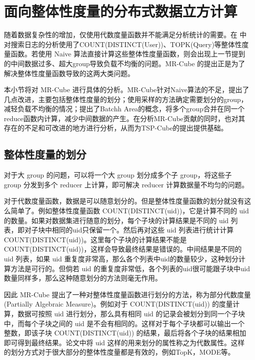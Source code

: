 \section{面向整体性度量的分布式数据立方计算}

随着数据复杂性的增加，仅使用代数度量函数并不能满足分析统计的需要。在 \cite{nandi2011distributed} 中对搜索日志的分析使用了COUNT(DISTINCT(User))、TOPK(Query)等整体性度量函数。若使用 Naive 算法直接计算这些整体性度量函数，则会出现上一节提到的中间数据过多、超大group导致负载不均衡的问题。MR-Cube \cite{nandi2011distributed} 的提出正是为了解决整体性度量函数导致的这两大类问题。

本小节将对 MR-Cube 进行具体的分析。MR-Cube针对Naive算法的不足，提出了几点改进，主要包括整体性度量的划分；使用采样的方法确定需要划分的group，减轻负载不均衡的情况；提出了Batchh Area的概念，将多个group合并在同一个reduce函数内计算，减少中间数据的产生。在分析MR-Cube贡献的同时，也对其存在的不足和可改进的地方进行分析，从而为TSP-Cube的提出提供基础。


\subsection{整体性度量的划分}

对于大 group 的问题，可以将一个大 group 划分成多个子 group，将这些子 group 分发到多个 reducer 上计算，即可解决 reducer 计算数据量不均匀的问题。

对于代数度量函数，数据是可以随意划分的。但是整体性度量函数的划分就没有这么简单了。例如整体性度量函数 COUNT(DISTINCT(uid))，它是计算不同的 uid 的数量。如果对数据集进行随意的划分，每个子块的计算结果是不同的 uid 列表，即对子块中相同的uid只保留一个。然后再对这些 uid 列表进行统计计算 COUNT(DISTINCT(uid))。这里每个子块的计算结果不能是COUNT(DISTINCT(uid))，这样会导致最终结果是错误的。中间结果是不同的 uid 列表，如果 uid 重复度非常高，那么各个列表中uid的数量较少，这种划分计算方法是可行的。但倘若 uid 的重复度非常低，各个列表的uid很可能跟子块中uid数量同样多，那么这种随意划分的方法则毫无作用。 

因此 MR-Cube 提出了一种对整体性度量函数进行划分的方法，称为部分代数度量 (Partially Algebraic Measure)。例如对于 COUNT(DISTINCT(uid)) 的度量计算，数据可按照 uid 进行划分，那么具有相同 uid 的记录会被划分到同一个子块中，而每个子块之间的 uid 是不会有相同的。这样对于每个子块都可以输出一个整数，即该子块 COUNT(DISTINCT(uid)) 的结果，最后将各个子块的结果相加即可得到最终结果。论文中将 uid 这样的用来划分的属性称之为代数属性。这样的划分方式对于很大部分的整体性度量都是有效的，例如TopK，MODE等。


